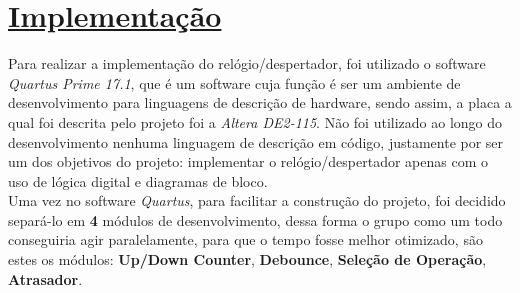 \documentclass[14pt, oneside]{book}
\newcommand\tab[1][1cm]{\hspace*{#1}}
\theoremstyle{definition}
\begin{document}
        \chapter[Implementação]{\hyperlink{toc}{Implementação}}
            \tab Para realizar a implementação do relógio/despertador, foi utilizado o software \textit{Quartus Prime 17.1}, que é um software cuja função é ser um ambiente de desenvolvimento para linguagens de descrição de hardware, sendo assim, a placa a qual foi descrita pelo projeto foi a \textit{Altera DE2-115}. Não foi utilizado ao longo do desenvolvimento nenhuma linguagem de descrição em código, justamente por ser um dos objetivos do projeto: implementar o relógio/despertador apenas com o uso de lógica digital e diagramas de bloco. \\
            \tab Uma vez no software \textit{Quartus}, para facilitar a construção do projeto, foi decidido separá-lo em \textbf{4} módulos de desenvolvimento, dessa forma o grupo como um todo conseguiria agir paralelamente, para que o tempo fosse melhor otimizado, são estes os módulos: \textbf{Up/Down Counter}, \textbf{Debounce}, \textbf{Seleção de Operação}, \textbf{Atrasador}.
            
\end{document}
